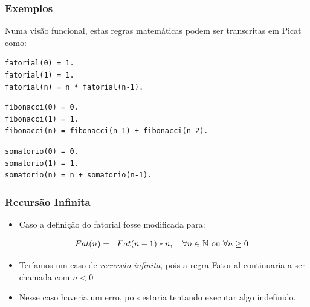 \begin{frame}[fragile]

\frametitle{Exemplos}

Numa visão funcional, estas regras matemáticas podem ser transcritas em Picat como:

    \begin{lstlisting}[frame=single]
fatorial(0) = 1.
fatorial(1) = 1.
fatorial(n) = n * fatorial(n-1).
    \end{lstlisting}

    \begin{lstlisting}[frame=single]
fibonacci(0) = 0.
fibonacci(1) = 1.
fibonacci(n) = fibonacci(n-1) + fibonacci(n-2).
    \end{lstlisting}

    \begin{lstlisting}[frame=single]
somatorio(0) = 0.
somatorio(1) = 1.
somatorio(n) = n + somatorio(n-1).
    \end{lstlisting}

\end{frame}


\begin{frame}[fragile]

\frametitle{Recursão Infinita}

    \begin{itemize}
        \item Caso a definição do fatorial fosse modificada para:
        
        \[
        Fat(n)= 
        \begin{tabular}[c]{ll}
            $Fat(n-1)\ast n$, &$\forall n \in \mathbb{N}$ ou $\forall n \geq 0$
        \end{tabular}
        \]
        \pause
        \item Teríamos um caso de \textit{recursão infinita}, pois a regra Fatorial continuaria
        a ser chamada com $n < 0$
        
        \item Nesse caso haveria um erro, pois estaria tentando executar algo indefinido.
        
    \end{itemize}

\end{frame}




